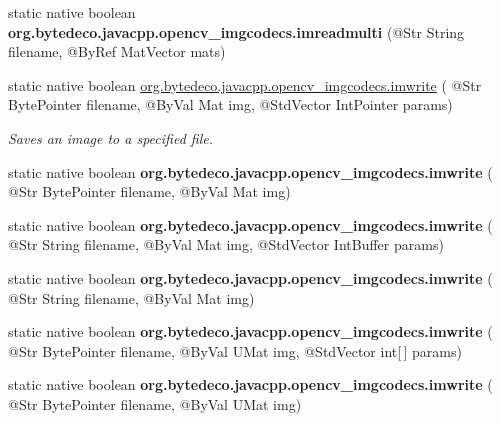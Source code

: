 \begin{DoxyCompactItemize}
\mbox{\label{group__imgcodecs_gae9ca55e2f9c80abaf5ec96a111da7313}} 
static native boolean {\bfseries org.\+bytedeco.\+javacpp.\+opencv\+\_\+imgcodecs.\+imreadmulti} (@Str String filename, @By\+Ref Mat\+Vector mats)
\item 
static native boolean \hyperlink{group__imgcodecs_ga6a41cdd78ff2dd6fff47515e6d60212c}{org.\+bytedeco.\+javacpp.\+opencv\+\_\+imgcodecs.\+imwrite} ( @Str Byte\+Pointer filename, @By\+Val Mat img, @Std\+Vector Int\+Pointer params)
\begin{DoxyCompactList}\small\item\em Saves an image to a specified file. \end{DoxyCompactList}\item 
\mbox{\label{group__imgcodecs_ga6d7ec9b02a965a98429561facf47e9d8}} 
static native boolean {\bfseries org.\+bytedeco.\+javacpp.\+opencv\+\_\+imgcodecs.\+imwrite} ( @Str Byte\+Pointer filename, @By\+Val Mat img)
\item 
\mbox{\label{group__imgcodecs_ga4d6511210c37f7aec51aa07921b38b77}} 
static native boolean {\bfseries org.\+bytedeco.\+javacpp.\+opencv\+\_\+imgcodecs.\+imwrite} ( @Str String filename, @By\+Val Mat img, @Std\+Vector Int\+Buffer params)
\item 
\mbox{\label{group__imgcodecs_ga812a9089f04f52e829262edc03eb2f4b}} 
static native boolean {\bfseries org.\+bytedeco.\+javacpp.\+opencv\+\_\+imgcodecs.\+imwrite} ( @Str String filename, @By\+Val Mat img)
\item 
\mbox{\label{group__imgcodecs_ga9800697b96d1e8fffc912c4ed49be8ea}} 
static native boolean {\bfseries org.\+bytedeco.\+javacpp.\+opencv\+\_\+imgcodecs.\+imwrite} ( @Str Byte\+Pointer filename, @By\+Val U\+Mat img, @Std\+Vector int\mbox{[}$\,$\mbox{]} params)
\item 
\mbox{\label{group__imgcodecs_ga833d35ba6e5be23a0ee3ae8994b4f6fa}} 
static native boolean {\bfseries org.\+bytedeco.\+javacpp.\+opencv\+\_\+imgcodecs.\+imwrite} ( @Str Byte\+Pointer filename, @By\+Val U\+Mat img)
\item 
\mbox{\label{group__imgcodecs_ga9cf3c3c61034e7485bdd0913a3b54678}} 

\end{DoxyCompactItemize}
